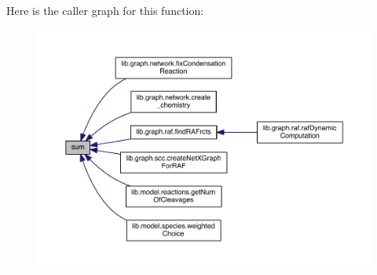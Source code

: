 Here is the caller graph for this function\+:\nopagebreak
\begin{figure}[H]
\begin{center}
\leavevmode
\includegraphics[width=350pt]{a00028_a576bebae86b11914280920c448def53d_icgraph}
\end{center}
\end{figure}


